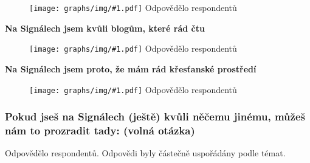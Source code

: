 \documentclass[12pt, a4paper, twoside]{article}
\newcommand{\answercount}[1]{Odpovědělo  respondentů}
\newcommand{\includegraph}[2]{
  \begin{figure}[H]
    \centering
    \textbf{#2}
    \texttt{[image: graphs/img/\#1.pdf]}
    \answercount{#1}
  \end{figure}
}
\begin{document}
\includegraph{proc_signaly_jedinecne_informace}{}

\textbf{Na Signálech jsem kvůli blogům, které rád čtu}

\includegraph{proc_signaly_oblibene_blogy}{}

\textbf{Na Signálech jsem proto, že mám rád křesťanské prostředí}

\includegraph{proc_signaly_krestanske_prostredi}{}

\subsubsection{Pokud jseš na Signálech (ještě) kvůli něčemu jinému, můžeš nám to prozradit tady: (volná otázka)}

\answercount{proc_signaly_jine}.
Odpovědi byly částečně uspořádány podle témat.
\end{document}
